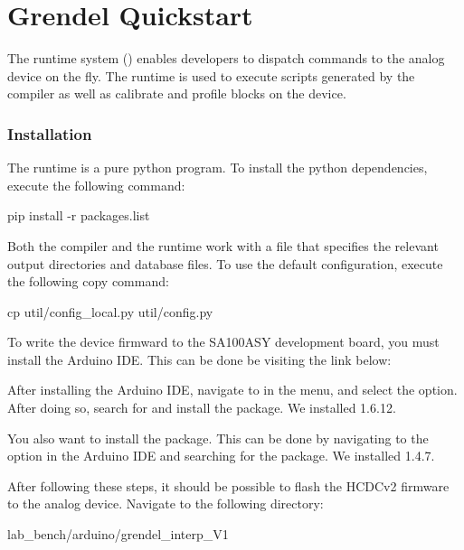 \chapter{Grendel Quickstart}

The \grendel runtime system () enables developers to dispatch
commands to the \hcdc analog device on the fly. The \grendel runtime is used to
execute scripts generated by the \legno compiler as well as calibrate and profile
blocks on the device. 

\subsection{Installation}

The \grendel runtime is a pure python program. To install the python
dependencies, execute the following command:

\begin{snippet}
  pip install -r packages.list
\end{snippet}



Both the \legno compiler and the \grendel runtime work with a 
file that specifies the relevant output directories and database files. To use
the default configuration, execute the following copy command:

\begin{snippet}
cp util/config_local.py util/config.py
\end{snippet}

To write the device firmward to the SA100ASY development board, you must install the Arduino
IDE. This can be done be visiting the link below:

After installing the Arduino IDE, navigate to  in the menu, and select the 
option. After doing so, search for  and install the  package.
We installed 1.6.12.

You also want to install the  package. This can be done by navigating to the 
 option in the Arduino IDE and searching for the  package.
We installed 1.4.7.

After following these steps, it should be possible to flash the HCDCv2 firmware to the analog device. Navigate
to the following directory:
\begin{snippet}
lab_bench/arduino/grendel_interp_V1
\end{snippet}

